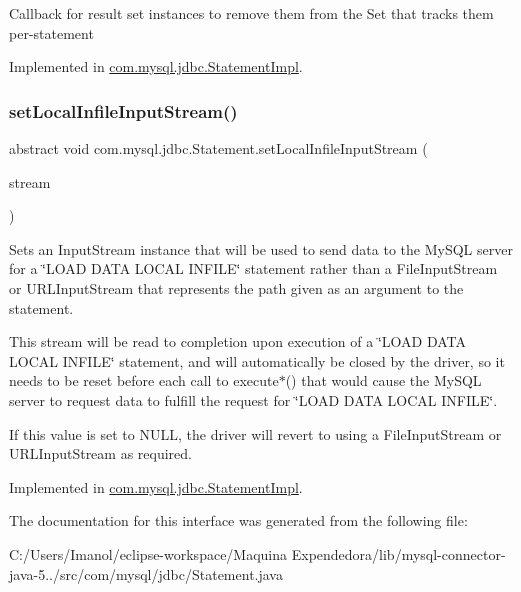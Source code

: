 Callback for result set instances to remove them from the Set that tracks them per-\/statement 

Implemented in \mbox{\hyperlink{classcom_1_1mysql_1_1jdbc_1_1_statement_impl_ab4429663e878a0b4b52445a95761b37d}{com.\+mysql.\+jdbc.\+Statement\+Impl}}.

\mbox{\label{interfacecom_1_1mysql_1_1jdbc_1_1_statement_ac5064854dd97b64cb4e94fa5492ce65e}} 
\subsubsection{\texorpdfstring{set\+Local\+Infile\+Input\+Stream()}{setLocalInfileInputStream()}}
{\footnotesize\ttfamily abstract void com.\+mysql.\+jdbc.\+Statement.\+set\+Local\+Infile\+Input\+Stream (\begin{DoxyParamCaption}\item[{Input\+Stream}]{stream }\end{DoxyParamCaption})\hspace{0.3cm}{\ttfamily [abstract]}}

Sets an Input\+Stream instance that will be used to send data to the My\+S\+QL server for a \char`\"{}\+L\+O\+A\+D D\+A\+T\+A L\+O\+C\+A\+L I\+N\+F\+I\+L\+E\char`\"{} statement rather than a File\+Input\+Stream or U\+R\+L\+Input\+Stream that represents the path given as an argument to the statement.

This stream will be read to completion upon execution of a \char`\"{}\+L\+O\+A\+D D\+A\+T\+A L\+O\+C\+A\+L I\+N\+F\+I\+L\+E\char`\"{} statement, and will automatically be closed by the driver, so it needs to be reset before each call to execute$\ast$() that would cause the My\+S\+QL server to request data to fulfill the request for \char`\"{}\+L\+O\+A\+D D\+A\+T\+A L\+O\+C\+A\+L I\+N\+F\+I\+L\+E\char`\"{}.

If this value is set to N\+U\+LL, the driver will revert to using a File\+Input\+Stream or U\+R\+L\+Input\+Stream as required. 

Implemented in \mbox{\hyperlink{classcom_1_1mysql_1_1jdbc_1_1_statement_impl_ae2d3d7d72cfa5be301a49828f8bfa126}{com.\+mysql.\+jdbc.\+Statement\+Impl}}.



The documentation for this interface was generated from the following file\+:\begin{DoxyCompactItemize}
\item 
C\+:/\+Users/\+Imanol/eclipse-\/workspace/\+Maquina Expendedora/lib/mysql-\/connector-\/java-\/5../src/com/mysql/jdbc/Statement.\+java\end{DoxyCompactItemize}
